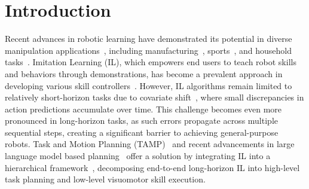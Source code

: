 \section{Introduction}
\label{sec:introduction}



Recent advances in robotic learning have demonstrated its potential in diverse manipulation applications~\cite{ravichandar2020recent}, including manufacturing~\cite{liu2022robot}, sports~\cite{zaidi2023athletic, chen2021learning}, and household tasks~\cite{yang2024enhancing, yang2024arcade}. Imitation Learning (IL), which empowers end users to teach robot skills and behaviors through demonstrations, has become a prevalent approach in developing various skill controllers~\cite{chi2023diffusion, kim2024openvla}. However, IL algorithms remain limited to relatively short-horizon tasks due to covariate shift~\cite{ross2011reduction, chang2021mitigating}, where small discrepancies in action predictions accumulate over time. This challenge becomes even more pronounced in long-horizon tasks, as such errors propagate across multiple sequential steps, creating a significant barrier to achieving general-purpose robots. Task and Motion Planning (TAMP)~\cite{garrett2021integrated, guo2023recent} and recent advancements in large language model based planning~\cite{ahn2022can, singh2023progprompt, du2023video} offer a solution by integrating IL into a hierarchical framework~\cite{xu2023xskill, zhu2022bottom, shiarlis2018taco}, decomposing end-to-end long-horizon IL into high-level task planning and low-level visuomotor skill execution.




